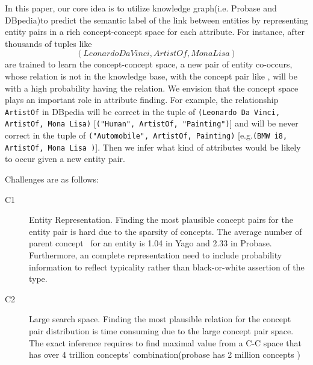 
In this paper, our core idea is to utilize knowledge graph(i.e. \ac{Probase} and \ac{DBpedia})to predict the semantic label of the link between entities by representing entity pairs in a rich concept-concept space for each attribute.
For instance, after thousands of tuples like $$(Leonardo Da Vinci, ArtistOf, Mona Lisa)$$ are trained to learn the concept-concept space, a new pair of entity co-occurs, whose relation is not in the knowledge base, with the concept pair like , will be with a high probability having the  relation.
We envision that the concept space plays an important role in attribute finding.
For example, the relationship {\tt ArtistOf} in \ac{DBpedia} will be correct in the tuple of {\tt(Leonardo Da Vinci, ArtistOf, Mona Lisa)} [{\tt("Human", ArtistOf, "Painting")}] and will be never correct in the tuple of {\tt ("Automobile", ArtistOf, Painting)} [e.g.{\tt(BMW i8, ArtistOf, Mona Lisa )}].
Then we infer what kind of attributes would be likely to occur given a new entity pair.

Challenges are as follows:
\begin{description}
  \item[C1] Entity Representation.
  Finding the most plausible concept pairs for the entity pair is hard due to the sparsity of concepts.
  The average number of parent concept~\cite{wu2012probase} for an entity is 1.04 in Yago and 2.33 in Probase.
  Furthermore, an complete representation need to include probability information to reflect typicality rather than black-or-white assertion of the type.
  \item[C2] Large search space.
  Finding the most plausible relation for the concept pair distribution is time consuming due to the large concept pair space.
  The exact inference requires to find maximal value from a C-C space that has over 4 trillion concepts' combination(probase has 2 million concepts )
\end{description}





